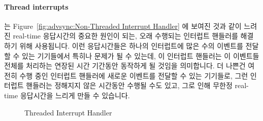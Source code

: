 \paragraph{Thread interrupts}
는
Figure~\ref{fig:advsync:Non-Threaded Interrupt Handler} 에 보여진 것과 같이
느려진 real-time 응답시간의 중요한 원인이 되는, 오래 수행되는 인터럽트 핸들러를
해결하기 위해 사용됩니다.
이런 응답시간들은 하나의 인터럽트에 많은 수의 이벤트를 전달할 수 있는
기기들에서 특히나 문제가 될 수 있는데, 이 인터럽트 핸들러는 이 이벤트들 전체를
처리하는 연장된 시간 기간동안 동작하게 될 것임을 의미합니다.
더 나쁜건 여전히 수행 중인 인터럽트 핸들러에 새로운 이벤트를 전달할 수 있는
기기들로, 그런 인터럽트 핸들러는 정해지지 않은 시간동안 수행될 수도 있고, 그로
인해 무한정 real-time 응답시간을 느리게 만들 수 있습니다.

\begin{figure}[tb]
\centering
{}
\caption{Threaded Interrupt Handler}
\label{fig:advsync:Threaded Interrupt Handler}
\end{figure}

